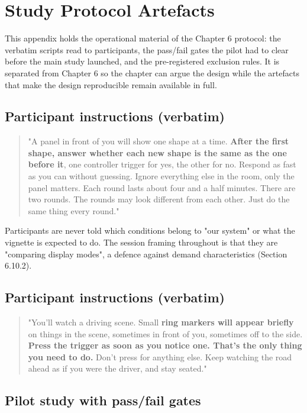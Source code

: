\chapter{Study Protocol Artefacts}

This appendix holds the operational material of the Chapter 6 protocol: the verbatim scripts read to
participants, the pass/fail gates the pilot had to clear before the main study launched, and the
pre-registered exclusion rules. It is separated from Chapter 6 so the chapter can argue the design
while the artefacts that make the design reproducible remain available in full.


\section{Participant instructions (verbatim)}

\begin{quote}
"A panel in front of you will show one shape at a time. \textbf{After the first shape, answer whether
each new shape is the same as the one before it}, one controller trigger for yes, the other for
no. Respond as fast as you can without guessing. Ignore everything else in the room, only the
panel matters. Each round lasts about four and a half minutes. There are two rounds. The rounds
may look different from each other. Just do the same thing every round."
\end{quote}

Participants are never told which conditions belong to "our system" or what the vignette is expected
to do. The session framing throughout is that they are "comparing display modes", a defence against
demand characteristics (Section 6.10.2).


\section{Participant instructions (verbatim)}

\begin{quote}
"You'll watch a driving scene. Small \textbf{ring markers will appear briefly} on things in the
scene, sometimes in front of you, sometimes off to the side. \textbf{Press the trigger as soon as
you notice one. That's the only thing you need to do.} Don't press for anything else. Keep watching
the road ahead as if you were the driver, and stay seated."
\end{quote}


\section{Pilot study with pass/fail gates}

